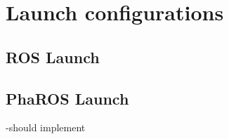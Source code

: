 \documentclass[a4paper,10pt,twoside]{book}
\begin{document}
\fi
\sloppy

\chapter{ Launch configurations }
					\section{ROS Launch}
					
					\section{PhaROS Launch}
				-should implement
				
				




\ifx\wholebook\relax\else
\end{document}
